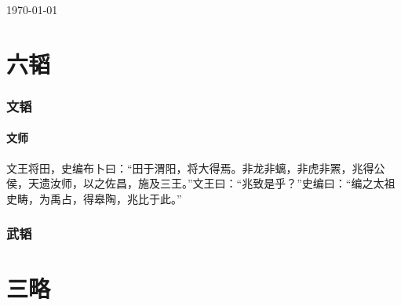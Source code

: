 \documentclass[11pt]{ctexart}
\begin{document}

\today
\tableofcontents

\part{六韬}
\section{文韬}
\subsection{文师}
文王将田，史编布卜曰：“田于渭阳，将大得焉。非龙非螭，非虎非罴，兆得公侯，天遗汝师，以之佐昌，施及三王。”文王曰：“兆致是乎？”史编曰：“编之太祖史畴，为禹占，得皋陶，兆比于此。” 

\section{武韬}

\part{三略}
\end{document}
